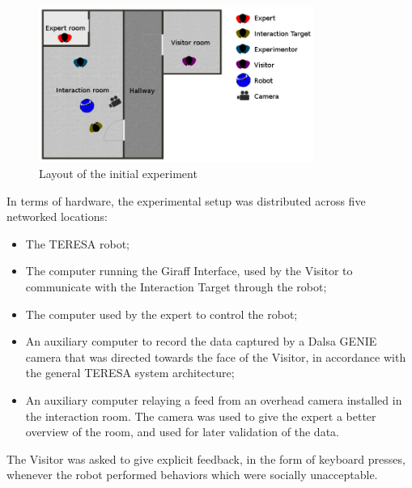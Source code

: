 \documentclass[a4paper,11pt]{report}
\begin{document}
\begin{figure}
    \centering
    \includegraphics[width=0.8\textwidth]{figures/experiment_setup_new.jpg}
    \caption{Layout of the initial experiment}
    	\label{fig:experiment_setup}
\end{figure} 

In terms of hardware, the experimental setup was distributed across five networked locations:
\begin{itemize}
\item The TERESA robot;
\item The computer running the Giraff Interface, used by the Visitor to communicate with the Interaction Target through the robot;
\item The computer used by the expert to control the robot;
\item An auxiliary computer to record the data captured by a Dalsa GENIE camera that was directed towards the face of the Visitor, in accordance with the general TERESA system architecture;
\item An auxiliary computer relaying a feed from an overhead camera installed in the interaction room. The camera was used to give the expert a better overview of the room, and used for later validation of the data.
\end{itemize}

The Visitor was asked to give explicit feedback, in the form of keyboard presses, whenever the robot performed behaviors which were socially unacceptable.
\end{document}
